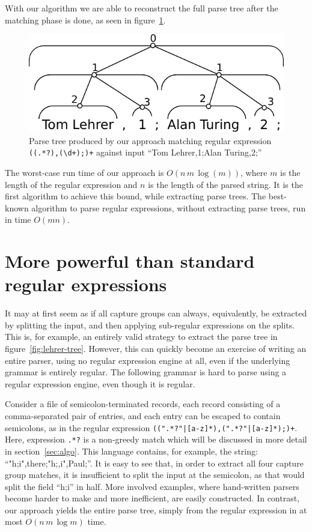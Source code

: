 \documentclass[11pt]{Thesis}
\theoremstyle{definition}
\newcommand{\Figref}[1]{figure~\ref{fig:#1}}
\newcommand{\Secref}[1]{section~\ref{sec:#1}}
\newcommand{\figlabel}[1]{\label{fig:#1}}
\newcommand{\seclabel}[1]{\label{sec:#1}}
\begin{document}
With our algorithm we are able to reconstruct the full parse
tree after the matching phase is done, as seen in \Figref{our-tree}.

\begin{figure}[htp]
\centering
\includegraphics[width=.75\linewidth]{graphs/full_parse}
\caption{\figlabel{lehrer-tree} Parse tree produced by our approach matching
regular expression \texttt{((.*?),(\textbackslash d+);)+} against input ``Tom
Lehrer,1;Alan Turing,2;''}
\figlabel{our-tree}
\end{figure}

The worst-case run time of our approach is $O(n\,m\,\log(m))$, where $m$ is
the length of the regular expression and $n$ is the length of the
parsed string. It is the first algorithm to achieve this bound,
while extracting parse trees. The best-known algorithm to parse
regular expressions, without extracting parse trees, run in time
$O(m n)$\cite{Sedg90a}.

\section{More powerful than standard regular expressions}
\seclabel{power}
It may at first seem as if all capture groups can always, equivalently,
be extracted by splitting the input, and then applying sub-regular
expressions on the splits.  This is, for example, an entirely valid
strategy to extract the parse tree in \Figref{lehrer-tree}.  However,
this can quickly become an exercise of writing an entire parser,
using no regular expression engine at all, even if the underlying
grammar is entirely regular.  The following grammar is hard to parse
using a regular expression engine, even though it is regular.

Consider a file of semicolon-terminated records, each record consisting
of a comma-separated pair of entries, and each entry can be escaped
to contain semicolons, as in the regular expression
\texttt{((".*?"|[a-z]*),(".*?"|[a-z]*);)+}. Here, expression
\texttt{.*?} is a non-greedy match which will be discussed in more
detail in \Secref{algo}.  This language contains, for example, the
string: ``"h;i",there;"h;,i",Paul;''.  It is easy to see that, in
order to extract all four capture group matches, it is insufficient
to split the input at the semicolon, as that would split the field
``h;i'' in half.  More involved examples, where hand-written parsers
become harder to make and more inefficient, are easily constructed.
In contrast, our approach yields the entire parse tree, simply from
the regular expression in at most $O(n\,m\,\log m)$ time.
\end{document}
